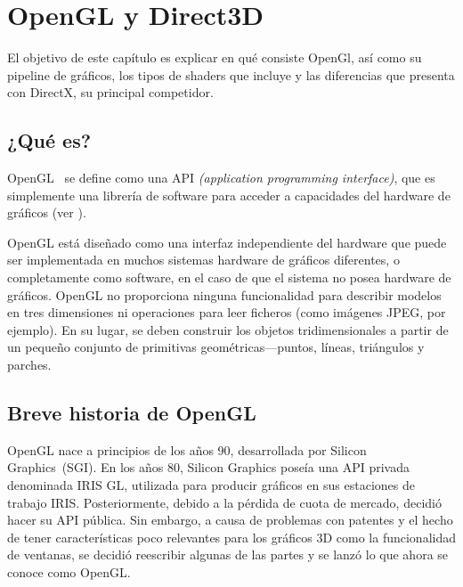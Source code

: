 
\cleardoublepage


\chapter{OpenGL y Direct3D}
\label{makereference2}

El objetivo de este capítulo es explicar en qué consiste OpenGl, así como su
pipeline de gráficos, los tipos de shaders que incluye y las diferencias que
presenta con DirectX, su principal competidor.\\

\section{¿Qué es?}
\label{makereference2.1}

OpenGL~\cite{OpenGL} se define como una API \textit{(application programming interface)}, que
es simplemente una librería de software para acceder a capacidades del hardware
de gráficos (ver \citet{Shreiner:2009:OPG:1696492}).

OpenGL está diseñado como una interfaz independiente del hardware que puede ser
implementada en muchos sistemas hardware de gráficos diferentes, o completamente
como software, en el caso de que el sistema no posea hardware de gráficos.
OpenGL no proporciona ninguna funcionalidad para describir modelos en tres
dimensiones ni operaciones para leer ficheros (como imágenes JPEG, por ejemplo).
En su lugar, se deben construir los objetos tridimensionales a partir de un
pequeño conjunto de primitivas geométricas---puntos, líneas, triángulos y
parches. 

\section{Breve historia de OpenGL}
\label{makereference2.2}

OpenGL nace a principios de los años 90, desarrollada por Silicon Graphics~(SGI).  En
los años 80, Silicon Graphics poseía una API privada denominada IRIS GL,
utilizada para producir gráficos en sus estaciones de trabajo IRIS.
Posteriormente, debido a la pérdida de cuota de mercado, decidió hacer su API
pública. Sin embargo, a causa de problemas con patentes y el hecho de tener
características poco relevantes para los gráficos 3D como la funcionalidad de
ventanas, se decidió reescribir algunas de las partes y se lanzó lo que ahora se
conoce como OpenGL.\\

